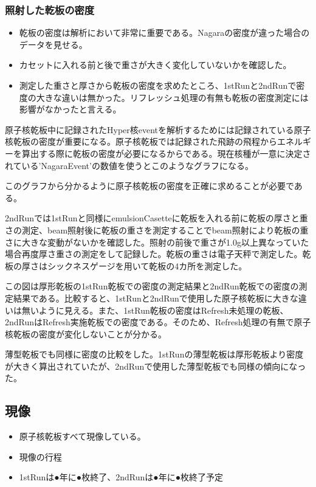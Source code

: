\documentclass[12pt,a4paper]{jarticle}
\begin{document}
\subsubsection{照射した乾板の密度}
\begin{itemize}
 \item 乾板の密度は解析において非常に重要である。Nagaraの密度が違った場合のデータを見せる。
 \item カセットに入れる前と後で重さが大きく変化していないかを確認した。
 \item 測定した重さと厚さから乾板の密度を求めたところ、1stRunと2ndRunで密度の大きな違いは無かった。リフレッシュ処理の有無も乾板の密度測定には影響がなかったと言える。
\end{itemize}
原子核乾板中に記録されたHyper核eventを解析するためには記録されている原子核乾板の密度が重要になる。原子核乾板では記録された飛跡の飛程からエネルギーを算出する際に乾板の密度が必要になるからである。現在核種が一意に決定されている'NagaraEvent'の数値を使うとこのようなグラフになる。\par
このグラフから分かるように原子核乾板の密度を正確に求めることが必要である。\par
2ndRunでは1stRunと同様にemulsionCasetteに乾板を入れる前に乾板の厚さと重さの測定、beam照射後に乾板の重さを測定することでbeam照射により乾板の重さに大きな変動がないかを確認した。照射の前後で重さが1.0g以上異なっていた場合再度厚さ重さの測定をして記録した。乾板の重さは電子天秤で測定した。乾板の厚さはシックネスゲージを用いて乾板の4カ所を測定した。\par
この図は厚形乾板の1stRun乾板での密度の測定結果と2ndRun乾板での密度の測定結果である。比較すると、1stRunと2ndRunで使用した原子核乾板に大きな違いは無いように見える。また、1stRun乾板の密度はRefresh未処理の乾板、2ndRunはRefresh実施乾板での密度である。そのため、Refresh処理の有無で原子核乾板の密度が変化しないことが分かる。\par
薄型乾板でも同様に密度の比較をした。1stRunの薄型乾板は厚形乾板より密度が大きく算出されていたが、2ndRunで使用した薄型乾板でも同様の傾向になった。
\subsection{現像}
\begin{itemize}
 \item 原子核乾板すべて現像している。
 \item 現像の行程
 \item 1stRunは●年に●枚終了、2ndRunは●年に●枚終了予定
\end{itemize}
\end{document}
